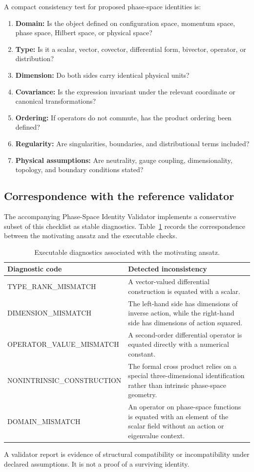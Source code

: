 A compact consistency test for proposed phase-space identities is:
\begin{enumerate}[label=\arabic*.]
  \item \textbf{Domain:} Is the object defined on configuration space, momentum space, phase space, Hilbert space, or physical space?
  \item \textbf{Type:} Is it a scalar, vector, covector, differential form, bivector, operator, or distribution?
  \item \textbf{Dimension:} Do both sides carry identical physical units?
  \item \textbf{Covariance:} Is the expression invariant under the relevant coordinate or canonical transformations?
  \item \textbf{Ordering:} If operators do not commute, has the product ordering been defined?
  \item \textbf{Regularity:} Are singularities, boundaries, and distributional terms included?
  \item \textbf{Physical assumptions:} Are neutrality, gauge coupling, dimensionality, topology, and boundary conditions stated?
\end{enumerate}

\subsection{Correspondence with the reference validator}

The accompanying Phase-Space Identity Validator implements a conservative subset of
this checklist as stable diagnostics. Table~\ref{tab:validator-codes} records the
correspondence between the motivating ansatz and the executable checks.

\begin{table}[ht]
\centering
\small
\renewcommand{\arraystretch}{1.25}
\begin{tabular}{>{\ttfamily\raggedright\arraybackslash}p{}
                >{\raggedright\arraybackslash}p{}}
\toprule
\textbf{Diagnostic code} & \textbf{Detected inconsistency} \\
\midrule
TYPE\_RANK\_MISMATCH
& A vector-valued differential construction is equated with a scalar. \\
DIMENSION\_MISMATCH
& The left-hand side has dimensions of inverse action, while the right-hand side has dimensions of action squared. \\
OPERATOR\_VALUE\_MISMATCH
& A second-order differential operator is equated directly with a numerical constant. \\
NONINTRINSIC\_CONSTRUCTION
& The formal cross product relies on a special three-dimensional identification rather than intrinsic phase-space geometry. \\
DOMAIN\_MISMATCH
& An operator on phase-space functions is equated with an element of the scalar field without an action or eigenvalue context. \\
\bottomrule
\end{tabular}
\caption{Executable diagnostics associated with the motivating ansatz.}
\label{tab:validator-codes}
\end{table}

A validator report is evidence of structural compatibility or incompatibility under
declared assumptions. It is not a proof of a surviving identity.
